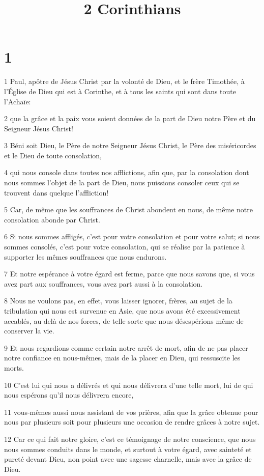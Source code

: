 

\title{2 Corinthians}


\chapter{1}

\par 1 Paul, apôtre de Jésus Christ par la volonté de Dieu, et le frère Timothée, à l'Église de Dieu qui est à Corinthe, et à tous les saints qui sont dans toute l'Achaïe:
\par 2 que la grâce et la paix vous soient données de la part de Dieu notre Père et du Seigneur Jésus Christ!
\par 3 Béni soit Dieu, le Père de notre Seigneur Jésus Christ, le Père des miséricordes et le Dieu de toute consolation,
\par 4 qui nous console dans toutes nos afflictions, afin que, par la consolation dont nous sommes l'objet de la part de Dieu, nous puissions consoler ceux qui se trouvent dans quelque l'affliction!
\par 5 Car, de même que les souffrances de Christ abondent en nous, de même notre consolation abonde par Christ.
\par 6 Si nous sommes affligés, c'est pour votre consolation et pour votre salut; si nous sommes consolés, c'est pour votre consolation, qui se réalise par la patience à supporter les mêmes souffrances que nous endurons.
\par 7 Et notre espérance à votre égard est ferme, parce que nous savons que, si vous avez part aux souffrances, vous avez part aussi à la consolation.
\par 8 Nous ne voulons pas, en effet, vous laisser ignorer, frères, au sujet de la tribulation qui nous est survenue en Asie, que nous avons été excessivement accablés, au delà de nos forces, de telle sorte que nous désespérions même de conserver la vie.
\par 9 Et nous regardions comme certain notre arrêt de mort, afin de ne pas placer notre confiance en nous-mêmes, mais de la placer en Dieu, qui ressuscite les morts.
\par 10 C'est lui qui nous a délivrés et qui nous délivrera d'une telle mort, lui de qui nous espérons qu'il nous délivrera encore,
\par 11 vous-mêmes aussi nous assistant de vos prières, afin que la grâce obtenue pour nous par plusieurs soit pour plusieurs une occasion de rendre grâces à notre sujet.
\par 12 Car ce qui fait notre gloire, c'est ce témoignage de notre conscience, que nous nous sommes conduits dans le monde, et surtout à votre égard, avec sainteté et pureté devant Dieu, non point avec une sagesse charnelle, mais avec la grâce de Dieu.
